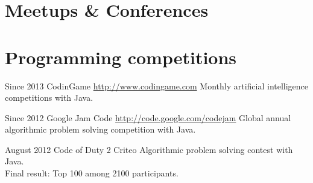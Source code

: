 \documentclass[11pt,a4paper]{moderncv}
\begin{document}
\section{Meetups \& Conferences}

\section{Programming competitions}

\cventry
{Since 2013}
{CodinGame}
{}
{\url{http://www.codingame.com}}
{}
{Monthly artificial intelligence competitions with Java.}

\cventry
{Since 2012}
{Google Jam Code}
{}
{\url{http://code.google.com/codejam}}
{}
{Global annual algorithmic problem solving competition with Java.}




\cventry
{August 2012}
{Code of Duty 2}
{Criteo}
{}
{}
{Algorithmic problem solving contest with Java.\\Final result: Top 100 among 2100 participants.}

\end{document}
